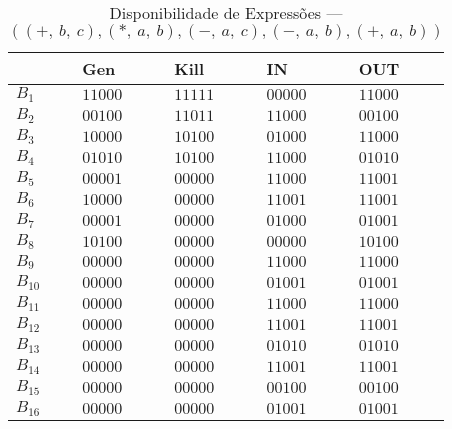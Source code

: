 \begin{table}[ht]
\centering
\begin{tabular}{l|l|l|l|l}
	& Gen & Kill & IN & OUT\\
\hline
$B_{1}$ &  $11000$ & $11111$ & $00000$ & $11000$\\
$B_{2}$ &  $00100$ & $11011$ & $11000$ & $00100$\\
$B_{3}$ &  $10000$ & $10100$ & $01000$ & $11000$\\
$B_{4}$ &  $01010$ & $10100$ & $11000$ & $01010$\\
$B_{5}$ &  $00001$ & $00000$ & $11000$ & $11001$\\
$B_{6}$ &  $10000$ & $00000$ & $11001$ & $11001$\\
$B_{7}$ &  $00001$ & $00000$ & $01000$ & $01001$\\
$B_{8}$ &  $10100$ & $00000$ & $00000$ & $10100$\\
$B_{9}$ &  $00000$ & $00000$ & $11000$ & $11000$\\
$B_{10}$ &  $00000$ & $00000$ & $01001$ & $01001$\\
$B_{11}$ &  $00000$ & $00000$ & $11000$ & $11000$\\
$B_{12}$ &  $00000$ & $00000$ & $11001$ & $11001$\\
$B_{13}$ &  $00000$ & $00000$ & $01010$ & $01010$\\
$B_{14}$ &  $00000$ & $00000$ & $11001$ & $11001$\\
$B_{15}$ &  $00000$ & $00000$ & $00100$ & $00100$\\
$B_{16}$ &  $00000$ & $00000$ & $01001$ & $01001$\\
\end{tabular}
\caption{Disponibilidade de Express\~oes --- $((+,\:b,\:c), (*,\:a,\:b), (-,\:a,\:c), (-,\:a,\:b), (+,\:a,\:b))$}
\end{table}

